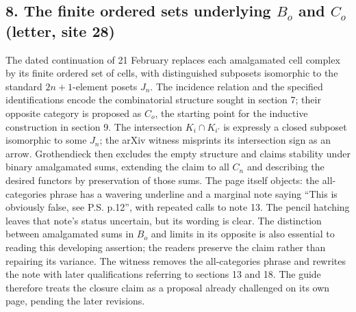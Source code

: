 \documentclass[10pt,oneside]{book}
\begin{document}
\subsection*{8. The finite ordered sets underlying $B_o$ and $C_o$ (letter, site 28)}
The dated continuation of 21 February replaces each amalgamated cell complex by its finite ordered set of cells, with distinguished subposets isomorphic to the standard $2n+1$-element posets $J_n$. The incidence relation and the specified identifications encode the combinatorial structure sought in section 7; their opposite category is proposed as $C_o$, the starting point for the inductive construction in section 9. The intersection $K_i\cap K_{i'}$ is expressly a closed subposet isomorphic to some $J_n$; the arXiv witness misprints its intersection sign as an arrow. Grothendieck then excludes the empty structure and claims stability under binary amalgamated sums, extending the claim to all $C_n$ and describing the desired functors by preservation of those sums. The page itself objects: the all-categories phrase has a wavering underline and a marginal note saying ``This is obviously false, see P.S. p.12'', with repeated calls to note 13. The pencil hatching leaves that note's status uncertain, but its wording is clear. The distinction between amalgamated sums in $B_o$ and limits in its opposite is also essential to reading this developing assertion; the readers preserve the claim rather than repairing its variance. The witness removes the all-categories phrase and rewrites the note with later qualifications referring to sections 13 and 18. The guide therefore treats the closure claim as a proposal already challenged on its own page, pending the later revisions.
\end{document}
